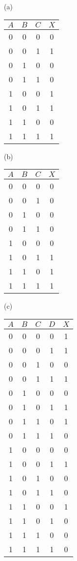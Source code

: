 \documentclass[a4paper,12pt]{article}
\begin{document}
(a) \begin{tabular}{c@{}c@{}c|c}
$A$ & $B$ & $C$ & $X$ \\
\hline
 0  &  0  &  0  &  0 \\
 0  &  0  &  1  &  1 \\
 0  &  1  &  0  &  0 \\
 0  &  1  &  1  &  0 \\
 1  &  0  &  0  &  1 \\
 1  &  0  &  1  &  1 \\
 1  &  1  &  0  &  0 \\
 1  &  1  &  1  &  1
\end{tabular}
\hfill
(b) \begin{tabular}{c@{}c@{}c|c}
$A$ & $B$ & $C$ & $X$ \\
\hline
 0  &  0  &  0  &  0 \\
 0  &  0  &  1  &  0 \\
 0  &  1  &  0  &  0 \\
 0  &  1  &  1  &  0 \\
 1  &  0  &  0  &  0 \\
 1  &  0  &  1  &  1 \\
 1  &  1  &  0  &  1 \\
 1  &  1  &  1  &  1
\end{tabular}
\hfill
(c) \begin{tabular}{c@{}c@{}c@{}c|c}
$A$ & $B$ & $C$ & $D$ & $X$ \\
\hline
 0  &  0  &  0  &  0  &  1 \\
 0  &  0  &  0  &  1  &  1 \\
 0  &  0  &  1  &  0  &  0 \\
 0  &  0  &  1  &  1  &  1 \\
 0  &  1  &  0  &  0  &  0 \\
 0  &  1  &  0  &  1  &  1 \\
 0  &  1  &  1  &  0  &  1 \\
 0  &  1  &  1  &  1  &  0 \\
 1  &  0  &  0  &  0  &  0 \\
 1  &  0  &  0  &  1  &  1 \\
 1  &  0  &  1  &  0  &  0 \\
 1  &  0  &  1  &  1  &  0 \\
 1  &  1  &  0  &  0  &  1 \\
 1  &  1  &  0  &  1  &  0 \\
 1  &  1  &  1  &  0  &  0 \\
 1  &  1  &  1  &  1  &  0 \\
\end{tabular}
\end{document}
